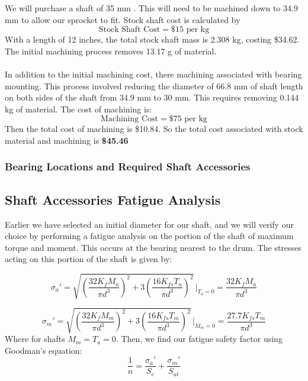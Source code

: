 \documentclass[letterpaper,12pt]{article}
\begin{document}
We will purchase a shaft of 35 mm . This will need to be machined down to 34.9 mm to allow our sprocket to fit. Stock shaft cost is calculated by
\begin{equation}
    \text{Stock Shaft Cost} = \$15 \text{ per kg}    
\end{equation}
With a length of 12 inches, the total stock shaft mass is 2.308 kg, costing \$34.62. The initial machining process removes 13.17 g of material.
\\\\
In addition to the initial machining cost, there machining associated with bearing mounting. This process involved reducing the diameter of 66.8 mm of shaft length on both sides of the shaft from 34.9 mm to 30 mm. This requires removing 0.144 kg of material. The cost of machining is:
\begin{equation}
    \text{Machining Cost} = \$75 \text{ per kg}   
\end{equation}
Then the total cost of machining is \$10.84. So the total cost associated with stock material and machining is \textbf{\$45.46}

\subsubsection{Bearing Locations and Required Shaft Accessories}

\subsection{Shaft Accessories Fatigue Analysis}

Earlier we have selected an initial diameter for our shaft, and we will verify our choice by performing a fatigue analysis on the portion of the shaft of maximum torque and moment. This occurs at the bearing nearest to the drum. The stresses acting on this portion of the shaft is given by:

\begin{equation}
    \sigma_a' = \sqrt{\left(\frac{32K_f M_a}{\pi d^3}\right)^2 + 3\left(\frac{16K_{fs} T_a}{\pi d^3}\right)^2}\, \bigg\rvert_{T_a = 0} = \frac{32K_f M_a}{\pi d^3}
\end{equation}

\begin{equation}
    \sigma_m' = \sqrt{\left(\frac{32K_f M_m}{\pi d^3}\right)^2 + 3\left(\frac{16K_{fs} T_m}{\pi d^3}\right)^2}\, \bigg\rvert_{M_m = 0} = \frac{27.7 K_{fs} T_m}{\pi d^3}
\end{equation}
Where for shafts $M_m = T_a = 0$. Then, we find our fatigue safety factor using Goodman's equation:
\begin{equation}
    \frac{1}{n} = \frac{\sigma_a'}{S_e} + \frac{\sigma_m'}{S_{ut}}
\end{equation}
\end{document}

